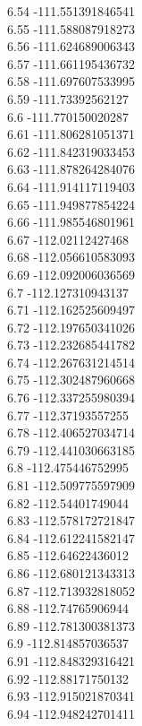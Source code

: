 {6.54	-111.551391846541\\
6.55	-111.588087918273\\
6.56	-111.624689006343\\
6.57	-111.661195436732\\
6.58	-111.697607533995\\
6.59	-111.73392562127\\
6.6	-111.770150020287\\
6.61	-111.806281051371\\
6.62	-111.842319033453\\
6.63	-111.878264284076\\
6.64	-111.914117119403\\
6.65	-111.949877854224\\
6.66	-111.985546801961\\
6.67	-112.02112427468\\
6.68	-112.056610583093\\
6.69	-112.092006036569\\
6.7	-112.127310943137\\
6.71	-112.162525609497\\
6.72	-112.197650341026\\
6.73	-112.232685441782\\
6.74	-112.267631214514\\
6.75	-112.302487960668\\
6.76	-112.337255980394\\
6.77	-112.37193557255\\
6.78	-112.406527034714\\
6.79	-112.441030663185\\
6.8	-112.475446752995\\
6.81	-112.509775597909\\
6.82	-112.54401749044\\
6.83	-112.578172721847\\
6.84	-112.612241582147\\
6.85	-112.64622436012\\
6.86	-112.680121343313\\
6.87	-112.713932818052\\
6.88	-112.74765906944\\
6.89	-112.781300381373\\
6.9	-112.814857036537\\
6.91	-112.848329316421\\
6.92	-112.88171750132\\
6.93	-112.915021870341\\
6.94	-112.948242701411\\
}
